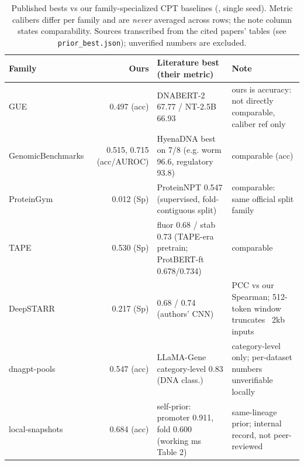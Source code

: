 \begin{table}[t]
\centering
\caption{Published bests vs our family-specialized CPT baselines (, single seed). Metric calibers differ per family and are \emph{never} averaged across rows; the note column states comparability. Sources transcribed from the cited papers' tables (see \texttt{prior\_best.json}); unverified numbers are excluded.}
\label{tab:priorbest}
\footnotesize
\begin{tabular}{p{}rp{}p{}}
\toprule
Family & Ours & Literature best (their metric) & Note \\
\midrule
GUE & 0.497 (acc) & DNABERT-2 67.77 / NT-2.5B 66.93 & ours is accuracy: not directly comparable, caliber ref only \\
GenomicBenchmarks & 0.515, 0.715 (acc/AUROC) & HyenaDNA best on 7/8 (e.g. worm 96.6, regulatory 93.8) & comparable (acc) \\
ProteinGym & 0.012 (Sp) & ProteinNPT 0.547 (supervised, fold-contiguous split) & comparable: same official split family \\
TAPE & 0.530 (Sp) & fluor 0.68 / stab 0.73 (TAPE-era pretrain; ProtBERT-ft 0.678/0.734) & comparable \\
DeepSTARR & 0.217 (Sp) & 0.68 / 0.74 (authors' CNN) & PCC vs our Spearman; 512-token window truncates ~2kb inputs \\
dnagpt-pools & 0.547 (acc) & LLaMA-Gene category-level 0.83 (DNA class.) & category-level only; per-dataset numbers unverifiable locally \\
local-snapshots & 0.684 (acc) & self-prior: promoter 0.911, fold 0.600 (working ms Table 2) & same-lineage prior; internal record, not peer-reviewed \\
\bottomrule
\end{tabular}
\end{table}
